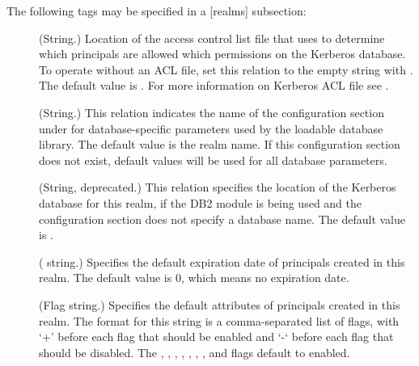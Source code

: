 \documentclass[letterpaper,10pt,english]{sphinxmanual}
\begin{document}
The following tags may be specified in a {[}realms{]} subsection:
\begin{description}
\item[{}] \leavevmode
(String.)  Location of the access control list file that
{\hyperref[\detokenize{admin/admin_commands/kadmind:kadmind-8}]{}} uses to determine which principals are allowed
which permissions on the Kerberos database.  To operate without an
ACL file, set this relation to the empty string with .  The default value is {\hyperref[\detokenize{mitK5defaults:paths}]{}}.  For more
information on Kerberos ACL file see {\hyperref[\detokenize{admin/conf_files/kadm5_acl:kadm5-acl-5}]{}}.

\item[{}] \leavevmode
(String.)  This relation indicates the name of the configuration
section under {\hyperref[\detokenize{admin/conf_files/kdc_conf:dbmodules}]{}} for database-specific parameters
used by the loadable database library.  The default value is the
realm name.  If this configuration section does not exist, default
values will be used for all database parameters.

\item[{}] \leavevmode
(String, deprecated.)  This relation specifies the location of the
Kerberos database for this realm, if the DB2 module is being used
and the {\hyperref[\detokenize{admin/conf_files/kdc_conf:dbmodules}]{}} configuration section does not specify a
database name.  The default value is {\hyperref[\detokenize{mitK5defaults:paths}]{}}.

\item[{}] \leavevmode
( string.)  Specifies the default expiration date of
principals created in this realm.  The default value is 0, which
means no expiration date.

\item[{}] \leavevmode
(Flag string.)  Specifies the default attributes of principals
created in this realm.  The format for this string is a
comma-separated list of flags, with ‘+’ before each flag that
should be enabled and ‘-‘ before each flag that should be
disabled.  The , , ,
, , , , and
 flags default to enabled.


\end{description}
\end{document}
